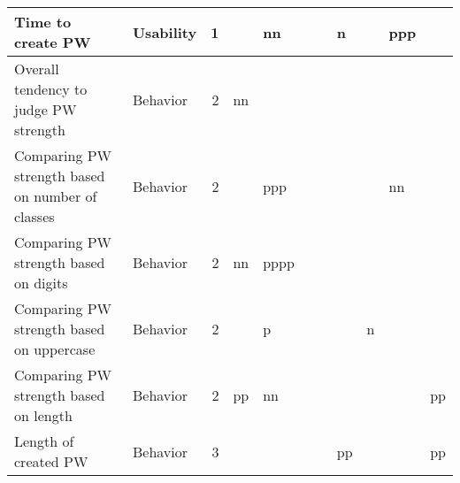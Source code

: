 \begin{table}[htbp]
{\begin{tabular}{lrrrrrrrrrr}
 Time to create PW & \multicolumn{1}{l}{Usability} & \multicolumn{1}{r|}{1} &       & \multicolumn{1}{l}{\cellcolor[rgb]{ .973,  .463,  .427} \textcolor[rgb]{ 1,  1,  1}{nn}} &       &       & \multicolumn{1}{l|}{\cellcolor[rgb]{ .871,  .549,  0} \textcolor[rgb]{ 1,  1,  1}{n}} &       & \multicolumn{1}{l}{\cellcolor[rgb]{ 0,  .753,  .545} \textcolor[rgb]{ 1,  1,  1}{ppp}} &  \\
 \midrule
 Overall tendency to judge PW strength & \multicolumn{1}{l}{Behavior} & \multicolumn{1}{r|}{2} & \multicolumn{1}{l}{\cellcolor[rgb]{ .973,  .463,  .427} \textcolor[rgb]{ 1,  1,  1}{nn}} &       &       &       & \multicolumn{1}{r|}{} &       &       &  \\
 Comparing PW strength based on number of classes & \multicolumn{1}{l}{Behavior} & \multicolumn{1}{r|}{2} &       & \multicolumn{1}{l}{\cellcolor[rgb]{ 0,  .753,  .545} \textcolor[rgb]{ 1,  1,  1}{ppp}} &       &       & \multicolumn{1}{r|}{} &       & \multicolumn{1}{l}{\cellcolor[rgb]{ .973,  .463,  .427} \textcolor[rgb]{ 1,  1,  1}{nn}} &  \\
 Comparing PW strength based on digits & \multicolumn{1}{l}{Behavior} & \multicolumn{1}{r|}{2} & \multicolumn{1}{l}{\cellcolor[rgb]{ .973,  .463,  .427} \textcolor[rgb]{ 1,  1,  1}{nn}} & \multicolumn{1}{l}{\cellcolor[rgb]{ 0,  .749,  .769} \textcolor[rgb]{ 1,  1,  1}{pppp}} &       &       & \multicolumn{1}{r|}{} &       &       &  \\
 Comparing PW strength based on uppercase & \multicolumn{1}{l}{Behavior} & \multicolumn{1}{r|}{2} &       & \multicolumn{1}{l}{\cellcolor[rgb]{ .486,  .682,  0} \textcolor[rgb]{ 1,  1,  1}{p}} &       &       & \multicolumn{1}{r|}{} & \multicolumn{1}{l}{\cellcolor[rgb]{ .871,  .549,  0} \textcolor[rgb]{ 1,  1,  1}{n}} &       &  \\
 Comparing PW strength based on length & \multicolumn{1}{l}{Behavior} & \multicolumn{1}{r|}{2} & \multicolumn{1}{l}{\cellcolor[rgb]{ 0,  .729,  .22} \textcolor[rgb]{ 1,  1,  1}{pp}} & \multicolumn{1}{l}{\cellcolor[rgb]{ .973,  .463,  .427} \textcolor[rgb]{ 1,  1,  1}{nn}} &       &       & \multicolumn{1}{r|}{} & \multicolumn{1}{l}{ } &       & \multicolumn{1}{l}{\cellcolor[rgb]{ 0,  .729,  .22} \textcolor[rgb]{ 1,  1,  1}{pp}} \\
 \midrule
 Length of created PW & \multicolumn{1}{l}{Behavior} & \multicolumn{1}{r|}{3} &       &       &       &       & \multicolumn{1}{l|}{\cellcolor[rgb]{ 0,  .729,  .22} \textcolor[rgb]{ 1,  1,  1}{pp}} &       &       & \multicolumn{1}{l}{\cellcolor[rgb]{ 0,  .729,  .22} \textcolor[rgb]{ 1,  1,  1}{pp}} \\

\end{tabular}}
\end{table}
